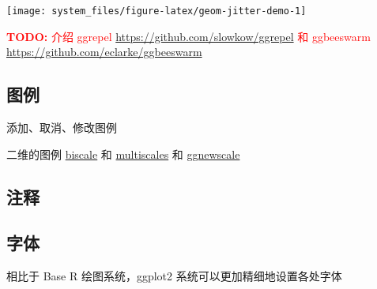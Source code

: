 \documentclass[
  b5paper,
  UTF8,twoside]{book}
\begin{document}
\begin{center}\texttt{[image: system\_files/figure-latex/geom-jitter-demo-1]} \end{center}

\textcolor{red}{\textbf{TODO: }{介绍 ggrepel \url{https://github.com/slowkow/ggrepel} 和 ggbeeswarm \url{https://github.com/eclarke/ggbeeswarm}}}

\hypertarget{subsec:legend}{%
\subsection{图例}\label{subsec:legend}}

添加、取消、修改图例

二维的图例 \href{https://github.com/slu-openGIS/biscale}{biscale} 和 \href{https://github.com/clauswilke/multiscales}{multiscales} 和 \href{https://github.com/eliocamp/ggnewscale}{ggnewscale}

\hypertarget{subsec:annotation}{%
\subsection{注释}\label{subsec:annotation}}

\hypertarget{subsec:font}{%
\subsection{字体}\label{subsec:font}}

相比于 Base R 绘图系统，ggplot2 系统可以更加精细地设置各处字体
\end{document}

